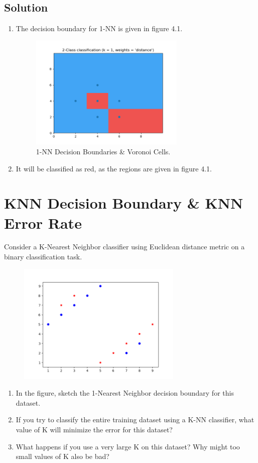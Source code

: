 \documentclass[12pt]{article}
\numberwithin{equation}{section}
\numberwithin{table}{section}
\numberwithin{figure}{section}
\begin{document}
\subsection*{Solution}
\begin{enumerate}[label=(\alph*)]
	\item The decision boundary for 1-NN is given in figure 4.1.
	
	\begin{figure}[!h]\centering
		\includegraphics[width=0.7\textwidth]{3_2.png}
		\caption{1-NN Decision Boundaries \& Voronoi Cells.}
		\label{pl1}
	\end{figure}

	\item It will be classified as red, as the regions are given in figure 4.1.
\end{enumerate}

\section{KNN Decision Boundary \& KNN Error Rate}
Consider a K-Nearest Neighbor classifier using Euclidean distance metric on a binary classification task.
	\begin{figure}[!h]\centering
	\includegraphics[width=0.7\textwidth]{4.png}
	\label{pl1}
\end{figure}
\begin{enumerate}[label=(\alph*)]
	\item In the figure, sketch the 1-Nearest Neighbor decision boundary for this dataset.
	\item If you try to classify the entire training dataset using a K-NN classifier, what value of K will minimize the error for this dataset?
	\item What happens if you use a very large K on this dataset? Why might too small values of K also be bad?
\end{enumerate}
\newpage
\end{document}
